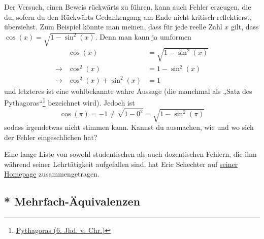 \begin{bem}
    Der Versuch, einen Beweis rückwärts zu führen, kann auch Fehler erzeugen, die du, sofern du den Rückwärts-Gedankengang am Ende nicht kritisch reflektierst, übersiehst. Zum Beispiel könnte man meinen, dass für jede reelle Zahl $x$ gilt, dass $\cos(x)=\sqrt{1-\sin^2(x)}$. Denn man kann ja umformen
    \begin{align*}
        &&\cos(x)& =\sqrt{1-\sin^2(x)} &\\
        & \to & \cos^2(x)& = 1-\sin^2(x) &\\
        & \to & \cos^2(x) + \sin^2(x) &= 1 &
    \end{align*}
    und letzteres ist eine wohlbekannte wahre Aussage (die manchmal als „Satz des Pythagoras“\footnote{\href{https://de.wikipedia.org/wiki/Pythagoras}{Pythagoras (6. Jhd. v. Chr.)}} bezeichnet wird). Jedoch ist
        \[ \cos(\pi) = -1 \neq \sqrt{1-0^2} = \sqrt{1-\sin^2(\pi)} \]
    sodass irgendetwas nicht stimmen kann. Kannst du ausmachen, wie und wo sich der Fehler eingeschlichen hat?
\end{bem}


\begin{bem}
 Eine lange Liste von sowohl studentischen als auch dozentischen Fehlern, die ihm während seiner Lehrtätigkeit aufgefallen sind, hat Eric Schechter auf \href{https://math.vanderbilt.edu/schectex/commerrs/}{seiner Homepage} zusammengetragen.
\end{bem}





\subsection*{* Mehrfach-Äquivalenzen}


